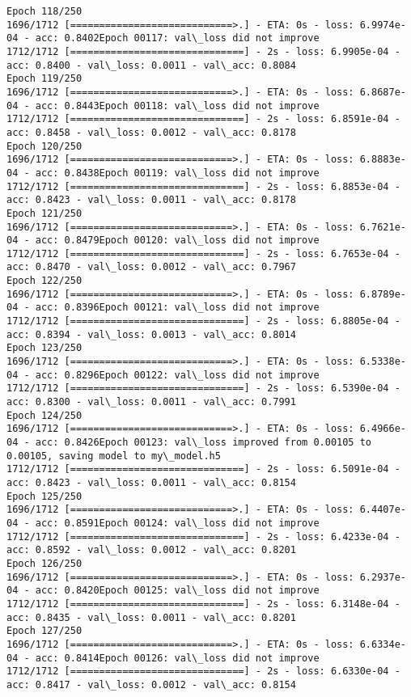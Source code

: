 \documentclass[11pt]{article}
\begin{document}
\begin{Verbatim}[commandchars=\\\{\}]
Epoch 118/250
1696/1712 [============================>.] - ETA: 0s - loss: 6.9974e-04 - acc: 0.8402Epoch 00117: val\_loss did not improve
1712/1712 [==============================] - 2s - loss: 6.9905e-04 - acc: 0.8400 - val\_loss: 0.0011 - val\_acc: 0.8084
Epoch 119/250
1696/1712 [============================>.] - ETA: 0s - loss: 6.8687e-04 - acc: 0.8443Epoch 00118: val\_loss did not improve
1712/1712 [==============================] - 2s - loss: 6.8591e-04 - acc: 0.8458 - val\_loss: 0.0012 - val\_acc: 0.8178
Epoch 120/250
1696/1712 [============================>.] - ETA: 0s - loss: 6.8883e-04 - acc: 0.8438Epoch 00119: val\_loss did not improve
1712/1712 [==============================] - 2s - loss: 6.8853e-04 - acc: 0.8423 - val\_loss: 0.0011 - val\_acc: 0.8178
Epoch 121/250
1696/1712 [============================>.] - ETA: 0s - loss: 6.7621e-04 - acc: 0.8479Epoch 00120: val\_loss did not improve
1712/1712 [==============================] - 2s - loss: 6.7653e-04 - acc: 0.8470 - val\_loss: 0.0012 - val\_acc: 0.7967
Epoch 122/250
1696/1712 [============================>.] - ETA: 0s - loss: 6.8789e-04 - acc: 0.8396Epoch 00121: val\_loss did not improve
1712/1712 [==============================] - 2s - loss: 6.8805e-04 - acc: 0.8394 - val\_loss: 0.0013 - val\_acc: 0.8014
Epoch 123/250
1696/1712 [============================>.] - ETA: 0s - loss: 6.5338e-04 - acc: 0.8296Epoch 00122: val\_loss did not improve
1712/1712 [==============================] - 2s - loss: 6.5390e-04 - acc: 0.8300 - val\_loss: 0.0011 - val\_acc: 0.7991
Epoch 124/250
1696/1712 [============================>.] - ETA: 0s - loss: 6.4966e-04 - acc: 0.8426Epoch 00123: val\_loss improved from 0.00105 to 0.00105, saving model to my\_model.h5
1712/1712 [==============================] - 2s - loss: 6.5091e-04 - acc: 0.8423 - val\_loss: 0.0011 - val\_acc: 0.8154
Epoch 125/250
1696/1712 [============================>.] - ETA: 0s - loss: 6.4407e-04 - acc: 0.8591Epoch 00124: val\_loss did not improve
1712/1712 [==============================] - 2s - loss: 6.4233e-04 - acc: 0.8592 - val\_loss: 0.0012 - val\_acc: 0.8201
Epoch 126/250
1696/1712 [============================>.] - ETA: 0s - loss: 6.2937e-04 - acc: 0.8420Epoch 00125: val\_loss did not improve
1712/1712 [==============================] - 2s - loss: 6.3148e-04 - acc: 0.8435 - val\_loss: 0.0011 - val\_acc: 0.8201
Epoch 127/250
1696/1712 [============================>.] - ETA: 0s - loss: 6.6334e-04 - acc: 0.8414Epoch 00126: val\_loss did not improve
1712/1712 [==============================] - 2s - loss: 6.6330e-04 - acc: 0.8417 - val\_loss: 0.0012 - val\_acc: 0.8154

\end{Verbatim}
\end{document}
